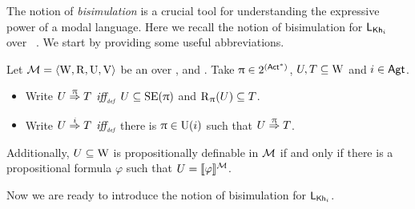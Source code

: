\medskip 

The notion of \emph{bisimulation} is a crucial tool for understanding the expressive power of a modal language. Here we recall the notion of bisimulation for $\mathsf{L}_{{\sf Kh}_i}$ over \ultss~\cite{AFSVQ23report}. We start by providing some useful abbreviations.

\medskip

\begin{definition}\label{def:notation}
Let $\mathcal{M}=\langle \operatorname{W},\operatorname{R},\operatorname{U},\operatorname{V} \rangle$ be an \ults over \PROP, \ACT and \AGT. Take $\uppi \in 2^{({\rm \sf Act}^*)}$, $U, T \subseteq \operatorname{W}$ and $i \in {\rm \sf Agt}$.
\begin{itemize} \itemsep 0pt
    \item Write $U \stackrel{\uppi}{\Rightarrow} T$ $\mbox{\it iff}_{\mbox{\tiny\it def}}$ $U \subseteq \operatorname{SE}(\uppi)$ and $\operatorname{R}_{\uppi}(U) \subseteq T$.

    \item Write $U \stackrel{i}{\Rightarrow} T$ $\mbox{\it iff}_{\mbox{\tiny\it def}}$ there is $\uppi \in \operatorname{U}(i)$ such that $U \stackrel{\uppi}{\Rightarrow} T$.
\end{itemize}
Additionally, $U \subseteq \operatorname{W}$ is propositionally definable in $\mathcal{M}$ if and only if there is a propositional formula $\varphi$ such that $U = \llbracket \varphi \rrbracket^{\mathcal{M}}$.
\end{definition}

\medskip

Now we are ready to introduce the notion of bisimulation for $\mathsf{L}_{{\sf Kh}_i}$. 

\medskip 

